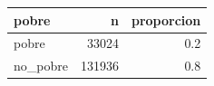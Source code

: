 
\begin{tabular}{lrr}
\toprule
pobre & n & proporcion\\
\midrule
pobre & 33024 & 0.2\\
no\_pobre & 131936 & 0.8\\
\bottomrule
\end{tabular}

